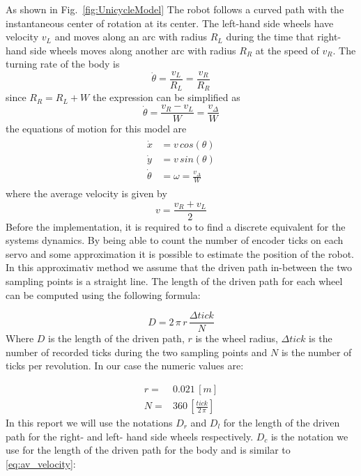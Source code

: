 As shown in Fig.~\ref{fig:UnicycleModel} The robot follows a curved path with the instantaneous center of rotation at its center.
The left-hand side wheels have velocity $v_L$ and moves along an arc with radius $R_L$ during the time that right-hand side wheels moves along another arc with radius $R_R$ at the speed of $v_R$.
The turning rate of the body is
\begin{equation*}
\dot{\theta}= \frac{v_L}{R_L} = \frac{v_R}{R_R}
\end{equation*}
since $R_R = R_L + W$ the expression can be simplified as
\begin{equation}
\dot{\theta}= \frac{v_R - v_L}{W} = \frac{v_\Delta}{W}\label{eq:ThetaDot}
\end{equation}
the equations of motion for this model are
\begin{eqnarray}
\begin{aligned}
\dot{x} &= v\,cos(\theta)\\
\dot{y} &= v\,sin(\theta)\\
\dot{\theta} &= \omega = \frac{v_\Delta}{W}
\end{aligned}
\label{eq:MotionEq}
\end{eqnarray}
where the average velocity \parencite{Corke2011} is given by
\begin{equation}
v = \frac{v_R + v_L}{2}
\label{eq:av_velocity}
\end{equation}
Before the implementation, it is required to to find a discrete equivalent for the systems dynamics. 
By being able to count the number of encoder ticks on each servo and some approximation it is possible to estimate the position of the robot.
In this approximativ method we assume that the driven path in-between the two sampling points is a straight line. 
The length of the driven path for each wheel can be computed using the following formula:

\begin{equation}
    D = 2\,\pi\,r\,\frac{\Delta tick}{N}
\end{equation}\label{eq:encoder-formula}
Where $D$ is the length of the driven path, $r$ is the wheel radius, $\Delta tick$ is the number of recorded ticks during the two sampling points and $N$ is the number of ticks per revolution. 
In our case the numeric values are:

\begin{eqnarray*}
    r =& 0.021\, [m]\\
    N =& 360\, [\frac{tick}{2\,\pi}]
\end{eqnarray*}
In this report we will use the notations $D_r$ and $D_l$ for the length of the driven path for the right- and left- hand side wheels respectively. 
$D_c$ is the notation we use for the length of the driven path for the body and is similar to \eqref{eq:av_velocity}:

